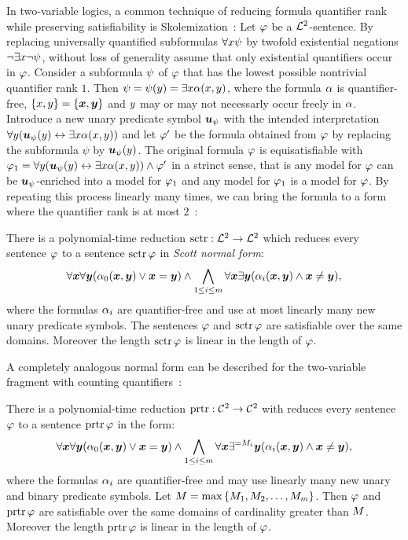 In two-variable logics, a common technique of reducing formula quantifier rank
while preserving satisfiability is Skolemization~\cite{gradel1999logics}:
Let $\varphi$ be a $\mathcal{L}^{2}$-sentence.
By replacing universally quantified subformulas $\forall x \psi$ by twofold
existential negations $\lnot\exists x \lnot\psi$, without loss of generality
assume that only existential quantifiers occur in $\varphi$.
Consider a subformula $\psi$ of $\varphi$ that has the lowest possible nontrivial
quantifier rank $1$.
Then $\psi = \psi(y) = \exists x \alpha(x,y)$, where the formula
$\alpha$ is quantifier-free, $\left\{x,y\right\} = \left\{\bm{x},\bm{y}\right\}$ and $y$ may
or may not necessarly occur freely in $\alpha$.
Introduce a new unary predicate symbol $\bm{u}_{\psi}$ with the intended
interpretation $\forall y(\bm{u}_{\psi}(y) \leftrightarrow \exists x \alpha(x,y))$ and
let ${\varphi'}$ be the formula obtained from $\varphi$ by replacing the subformula
$\psi$ by $\bm{u}_{\psi}(y)$.
The original formula $\varphi$ is equisatisfiable with
$\varphi_1 = \forall y(\bm{u}_{\psi}(y) \leftrightarrow \exists x \alpha(x,y)) \land
{\varphi'}$ in a strinct sense, that is any model for $\varphi$ can be
$\bm{u}_{\psi}$-enriched into a model for $\varphi_1$ and any model for $\varphi_1$ is a
model for $\varphi$.
By repeating this process linearly many times, we can bring the formula to a
form where the quantifier rank is at most 
$2$~\cite{scott1962decision,gradel1999logics}:
\begin{theorem}[Scott]
There is a polynomial-time reduction $\operatorname{sctr}: \mathcal{L}^{2} \to \mathcal{L}^{2}$ which reduces
every sentence $\varphi$ to a sentence $\operatorname{sctr}\varphi$ in \emph{Scott normal form}:
\[
  \forall\bm{x}\forall\bm{y}(\alpha_{0}(\bm{x},\bm{y}) \lor \bm{x} = \bm{y}) \land
  \bigwedge_{1 \leq i \leq m} \forall\bm{x}\exists\bm{y}
  (\alpha_{i}(\bm{x},\bm{y}) \land \bm{x} \neq \bm{y}),
\]
where the formulas $\alpha_{i}$ are quantifier-free and use at most linearly many
new unary predicate symbols. The sentences $\varphi$ and $\operatorname{sctr}\varphi$ are
satisfiable over the same domains.
Moreover the length $\operatorname{sctr}\varphi$ is linear in the length of $\varphi$.
\end{theorem}

A completely analogous normal form can be described for the two-variable
fragment with counting quantifiers~\cite{MALQ:MALQ201400102}:
\begin{theorem}
There is a polynomial-time reduction $\operatorname{prtr}: \mathcal{C}^{2} \to \mathcal{C}^{2}$ with reduces
every sentence $\varphi$ to a sentence $\operatorname{prtr}\varphi$ in the form:
\[
  \forall\bm{x}\forall\bm{y}(\alpha_{0}(\bm{x},\bm{y}) \lor \bm{x}=\bm{y}) \land
  \bigwedge_{1 \leq i \leq m} \forall\bm{x}\exists^{=M_{i}}\bm{y}
  (\alpha_{i}(\bm{x},\bm{y}) \land \bm{x}\neq\bm{y}),
\]
where the formulas $\alpha_{i}$ are quantifier-free and may use linearly many new
unary and binary predicate symbols. Let $M = \max\left\{M_{1},M_{2},\dots,M_{m}\right\}$.
Then $\varphi$ and $\operatorname{prtr}\varphi$ are satisfiable over the same domains of
cardinality greater than $M$.
Moreover the length $\operatorname{prtr}\varphi$ is linear in the length of $\varphi$.
\end{theorem}
